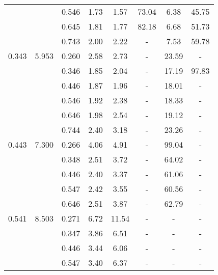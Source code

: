 \begin{table}[htbp]
\begin{center}
\begin{tabular}{|ccc||ccccc|}
         &          &    0.546 &         1.73 &         1.57 &        73.04 &         6.38 &        45.75 \\
         &          &    0.645 &         1.81 &         1.77 &        82.18 &         6.68 &        51.73 \\
         &          &    0.743 &         2.00 &         2.22 &            - &         7.53 &        59.78 \\
   0.343 &   5.953 &   0.260 &         2.58 &         2.73 &            - &        23.59 &            - \\
         &          &    0.346 &         1.85 &         2.04 &            - &        17.19 &        97.83 \\
         &          &    0.446 &         1.87 &         1.96 &            - &        18.01 &            - \\
         &          &    0.546 &         1.92 &         2.38 &            - &        18.33 &            - \\
         &          &    0.646 &         1.98 &         2.54 &            - &        19.12 &            - \\
         &          &    0.744 &         2.40 &         3.18 &            - &        23.26 &            - \\
   0.443 &   7.300 &   0.266 &         4.06 &         4.91 &            - &        99.04 &            - \\
         &          &    0.348 &         2.51 &         3.72 &            - &        64.02 &            - \\
         &          &    0.446 &         2.40 &         3.37 &            - &        61.06 &            - \\
         &          &    0.547 &         2.42 &         3.55 &            - &        60.56 &            - \\
         &          &    0.646 &         2.51 &         3.87 &            - &        62.79 &            - \\
   0.541 &   8.503 &   0.271 &         6.72 &        11.54 &            - &            - &            - \\
         &          &    0.347 &         3.86 &         6.51 &            - &            - &            - \\
         &          &    0.446 &         3.44 &         6.06 &            - &            - &            - \\
         &          &    0.547 &         3.40 &         6.37 &            - &            - &            - \\

\end{tabular}
\end{center}
\end{table}
